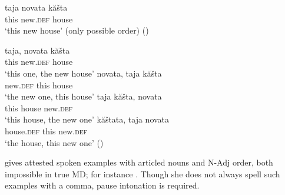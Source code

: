\documentclass[output=paper]{langscibook}
\begin{document}
\ea \label{house}
\gll taja novata kăšta\\
this new.\textsc{def} house\\
\glt `this new house’ 	(only possible order) \hfill()
\z


\ea \label{houses}
\ea \label{houses1}
\gll taja, novata kăšta\\
this new.\textsc{def} house\\
\glt `this one, the new house’
\ex \label{houses2}
\gll novata, taja kăšta \\
    new.\textsc{def} this house \\
    \glt `the new one, this house'
\ex \label{houses3}
\gll taja kăšta, novata \\
     this house new.\textsc{def}\\
    \glt `this house, the new one'
\ex \label{houses4}
\gll kăštata, taja  novata \\
     house.\textsc{def} this new.\textsc{def}\\
    \glt `the house, this new one' \hfill ()
\z
\z

\noindent \citet{Angelova1994} gives attested spoken examples with articled nouns and N-Adj order, both impossible in true MD; for instance . Though she does not always spell such examples with a comma, pause intonation is required.
\end{document}
